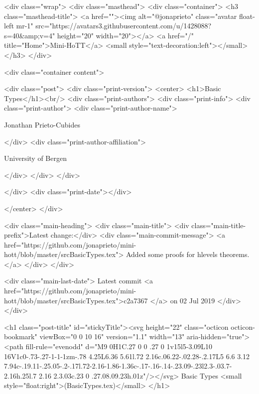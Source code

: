     <div class="wrap">
      <div class="masthead">
        <div class="container">
          <h3 class="masthead-title">
            <a href=""><img alt="@jonaprieto" class="avatar float-left mr-1" src="https://avatars3.githubusercontent.com/u/1428088?s=40&amp;v=4" height="20" width="20"></a>
            <a href="/" title="Home">Mini-HoTT</a>
            <small style="text-decoration:left"></small>
          </h3>
        </div>
      
      <div class="container content">
        







<div class="post">
  <div class="print-version">
    <center>
      <h1>Basic Types</h1><br/>
        <div class="print-authors">
          <div class="print-info">
            <div class="print-author">
              <div class="print-author-name">
                
                  Jonathan Prieto-Cubides
                
              </div>
              <div class="print-author-affiliation">
                
                  University of Bergen
                
                </div>
            </div>
          </div>
          
          
        </div>
        <div class="print-date"></div>
        
        
    </center>
  </div>

  
  <div class="main-heading">
    <div class="main-title">
      <div class="main-title-prefix">Latest change:</div>
      <div class="main-commit-message">
            <a href="https://github.com/jonaprieto/mini-hott/blob/master/srcBasicTypes.tex">
              Added some proofs for hlevels theorems.</a>
      </div>
    </div>

    <div class="main-last-date">
      Latest commit <a href="https://github.com/jonaprieto/mini-hott/blob/master/srcBasicTypes.tex">c2a7367 </a> on  02 Jul 2019
    </div>
  </div>
  

  <h1 class="post-title" id="stickyTitle"><svg height="22" class="octicon octicon-bookmark" viewBox="0 0 10 16" version="1.1" width="13" aria-hidden="true"><path fill-rule="evenodd" d="M9 0H1C.27 0 0 .27 0 1v15l5-3.09L10 16V1c0-.73-.27-1-1-1zm-.78 4.25L6.36 5.61l.72 2.16c.06.22-.02.28-.2.17L5 6.6 3.12 7.94c-.19.11-.25.05-.2-.17l.72-2.16-1.86-1.36c-.17-.16-.14-.23.09-.23l2.3-.03.7-2.16h.25l.7 2.16 2.3.03c.23 0 .27.08.09.23h.01z"/></svg> Basic Types <small style="float:right">(BasicTypes.tex)</small>
  </h1>

